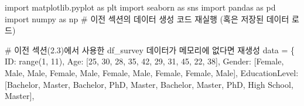 \documentclass[
  letterpaper,
]{book}
\newenvironment{Shaded}{\begin{snugshade}}{\end{snugshade}}
\newcommand{\BuiltInTok}[1]{\textcolor[rgb]{0.00,0.23,0.31}{#1}}
\newcommand{\CommentTok}[1]{\textcolor[rgb]{0.37,0.37,0.37}{#1}}
\newcommand{\DecValTok}[1]{\textcolor[rgb]{0.68,0.00,0.00}{#1}}
\newcommand{\ImportTok}[1]{\textcolor[rgb]{0.00,0.46,0.62}{#1}}
\newcommand{\NormalTok}[1]{\textcolor[rgb]{0.00,0.23,0.31}{#1}}
\newcommand{\OperatorTok}[1]{\textcolor[rgb]{0.37,0.37,0.37}{#1}}
\newcommand{\StringTok}[1]{\textcolor[rgb]{0.13,0.47,0.30}{#1}}
\begin{document}
\begin{Shaded}
\begin{Highlighting}[]
\ImportTok{import}\NormalTok{ matplotlib.pyplot }\ImportTok{as}\NormalTok{ plt}
\ImportTok{import}\NormalTok{ seaborn }\ImportTok{as}\NormalTok{ sns}
\ImportTok{import}\NormalTok{ pandas }\ImportTok{as}\NormalTok{ pd}
\ImportTok{import}\NormalTok{ numpy }\ImportTok{as}\NormalTok{ np }\CommentTok{\# 이전 섹션의 데이터 생성 코드 재실행 (혹은 저장된 데이터 로드)}

\CommentTok{\# 이전 섹션(2.3)에서 사용한 df\_survey 데이터가 메모리에 없다면 재생성}
\NormalTok{data }\OperatorTok{=}\NormalTok{ \{}
    \StringTok{\textquotesingle{}ID\textquotesingle{}}\NormalTok{: }\BuiltInTok{range}\NormalTok{(}\DecValTok{1}\NormalTok{, }\DecValTok{11}\NormalTok{),}
    \StringTok{\textquotesingle{}Age\textquotesingle{}}\NormalTok{: [}\DecValTok{25}\NormalTok{, }\DecValTok{30}\NormalTok{, }\DecValTok{28}\NormalTok{, }\DecValTok{35}\NormalTok{, }\DecValTok{42}\NormalTok{, }\DecValTok{29}\NormalTok{, }\DecValTok{31}\NormalTok{, }\DecValTok{45}\NormalTok{, }\DecValTok{22}\NormalTok{, }\DecValTok{38}\NormalTok{],}
    \StringTok{\textquotesingle{}Gender\textquotesingle{}}\NormalTok{: [}\StringTok{\textquotesingle{}Female\textquotesingle{}}\NormalTok{, }\StringTok{\textquotesingle{}Male\textquotesingle{}}\NormalTok{, }\StringTok{\textquotesingle{}Male\textquotesingle{}}\NormalTok{, }\StringTok{\textquotesingle{}Female\textquotesingle{}}\NormalTok{, }\StringTok{\textquotesingle{}Male\textquotesingle{}}\NormalTok{, }\StringTok{\textquotesingle{}Female\textquotesingle{}}\NormalTok{, }\StringTok{\textquotesingle{}Male\textquotesingle{}}\NormalTok{, }\StringTok{\textquotesingle{}Female\textquotesingle{}}\NormalTok{, }\StringTok{\textquotesingle{}Female\textquotesingle{}}\NormalTok{, }\StringTok{\textquotesingle{}Male\textquotesingle{}}\NormalTok{],}
    \StringTok{\textquotesingle{}EducationLevel\textquotesingle{}}\NormalTok{: [}\StringTok{\textquotesingle{}Bachelor\textquotesingle{}}\NormalTok{, }\StringTok{\textquotesingle{}Master\textquotesingle{}}\NormalTok{, }\StringTok{\textquotesingle{}Bachelor\textquotesingle{}}\NormalTok{, }\StringTok{\textquotesingle{}PhD\textquotesingle{}}\NormalTok{, }\StringTok{\textquotesingle{}Master\textquotesingle{}}\NormalTok{, }\StringTok{\textquotesingle{}Bachelor\textquotesingle{}}\NormalTok{, }\StringTok{\textquotesingle{}Master\textquotesingle{}}\NormalTok{, }\StringTok{\textquotesingle{}PhD\textquotesingle{}}\NormalTok{, }\StringTok{\textquotesingle{}High School\textquotesingle{}}\NormalTok{, }\StringTok{\textquotesingle{}Master\textquotesingle{}}\NormalTok{],}

\end{Highlighting}
\end{Shaded}
\end{document}
